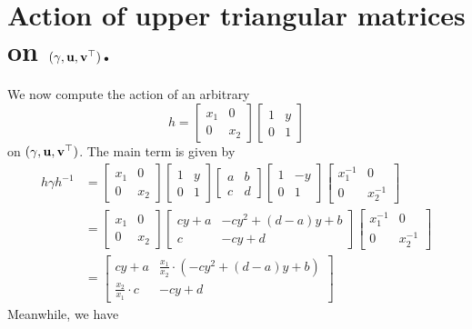 \section{Action of upper triangular matrices on $(\gamma, \mathbf u, \mathbf v^\top)$.}
We now compute the action of an arbitrary
\[ h = \begin{bmatrix} x_1 & 0 \\ 0 & x_2 \end{bmatrix}
  \begin{bmatrix} 1 & y \\ 0 & 1 \end{bmatrix} \]
on $(\gamma, \mathbf u, \mathbf v^\top)$.
The main term is given by
\begin{align*}
  h \gamma h^{-1}
  &=
  \begin{bmatrix} x_1 & 0 \\ 0 & x_2 \end{bmatrix}
  \begin{bmatrix} 1 & y \\ 0 & 1 \end{bmatrix}
  \begin{bmatrix} a & b \\ c & d \end{bmatrix}
  \begin{bmatrix} 1 & -y \\ 0 & 1 \end{bmatrix}
  \begin{bmatrix} x_1^{-1} & 0 \\ 0 & x_2^{-1} \end{bmatrix} \\
  &=
  \begin{bmatrix} x_1 & 0 \\ 0 & x_2 \end{bmatrix}
  \begin{bmatrix} cy + a & -cy^2+(d-a)y+b \\ c & -cy+d \end{bmatrix}
  \begin{bmatrix} x_1^{-1} & 0 \\ 0 & x_2^{-1} \end{bmatrix} \\
  &=
  \begin{bmatrix} cy + a & \frac{x_1}{x_2} \cdot \left( -cy^2+(d-a)y+b \right) \\
    \frac{x_2}{x_1} \cdot c & -cy+d \end{bmatrix}
\end{align*}
Meanwhile, we have
